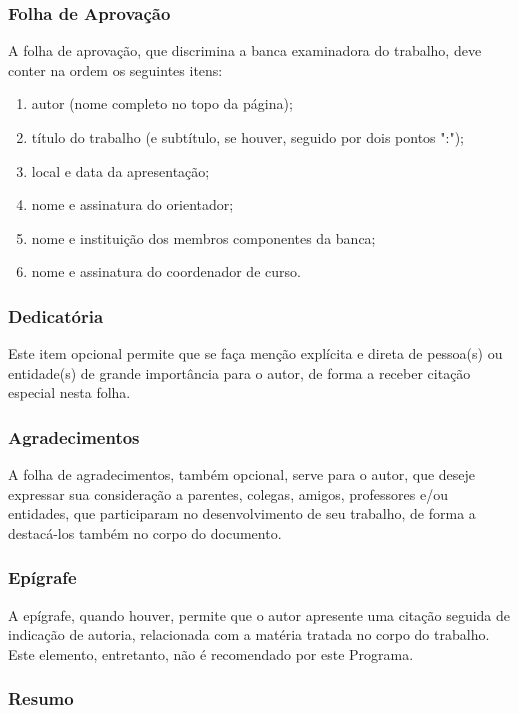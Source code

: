 \documentclass[repeatfields,xlists,xpacks,oneside,yearsonly]{ufrgscca}
\begin{document}
\subsubsection{Folha de Aprovação}

A folha de aprovação, que discrimina a banca examinadora do trabalho, deve
conter na ordem os seguintes itens:

\begin{enumerate}
\item autor (nome completo no topo da página);
\item título do trabalho (e subtítulo, se houver, seguido por dois pontos ":");
\item local e data da apresentação;
\item nome e assinatura do orientador;
\item nome e instituição dos membros componentes da banca;
\item nome e assinatura do coordenador de curso.
\end{enumerate}

\subsubsection{Dedicatória}

Este item opcional permite que se faça menção explícita e direta de
pessoa(s) ou entidade(s) de grande importância para o autor, de forma a
receber citação especial nesta folha.

\subsubsection{Agradecimentos}

A folha de agradecimentos, também opcional, serve para o autor, que deseje
expressar sua consideração a parentes, colegas, amigos, professores e/ou
entidades, que participaram no desenvolvimento de seu trabalho, de forma a
destacá-los também no corpo do documento.

\subsubsection{Epígrafe}

A epígrafe, quando houver, permite que o autor apresente uma citação seguida
de indicação de autoria, relacionada com a matéria tratada no corpo do
trabalho. Este elemento, entretanto, não é recomendado por este Programa.

\subsubsection{Resumo}
\end{document}
